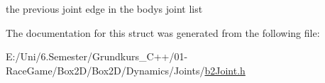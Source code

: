 the previous joint edge in the body\textquotesingle{}s joint list 



The documentation for this struct was generated from the following file\+:\begin{DoxyCompactItemize}
\item 
E\+:/\+Uni/6.\+Semester/\+Grundkurs\+\_\+\+C++/01-\/\+Race\+Game/\+Box2\+D/\+Box2\+D/\+Dynamics/\+Joints/\mbox{\hyperlink{b2_joint_8h}{b2\+Joint.\+h}}\end{DoxyCompactItemize}
